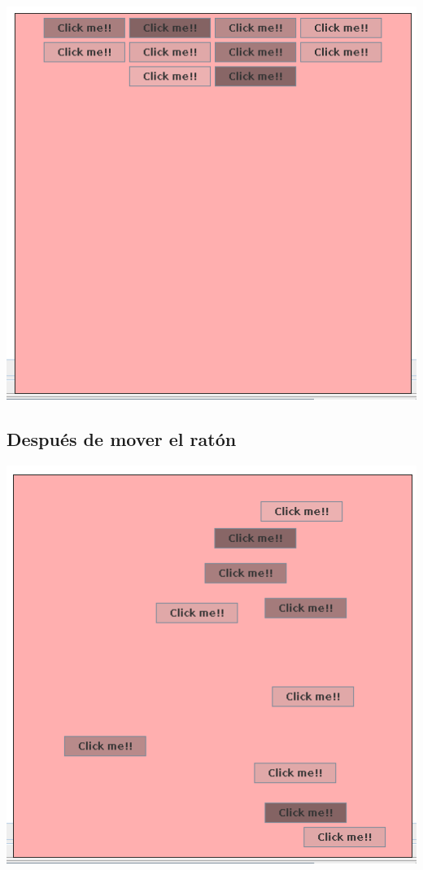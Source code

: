 \documentclass[12pt]{article}
\begin{document}
\includegraphics[width=\textwidth]{Ejecucion3.png}

\subsection*{Después de mover el ratón}

\includegraphics[width=\textwidth]{Ejecucion1.png}
\end{document}
